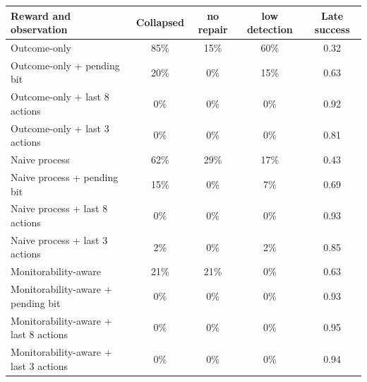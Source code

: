 \begin{tabular}{lcccc}
\toprule
Reward and observation & Collapsed & no repair & low detection & Late success \\
\midrule
Outcome-only & 85\% & 15\% & 60\% & 0.32 \\
Outcome-only + pending bit & 20\% & 0\% & 15\% & 0.63 \\
Outcome-only + last 8 actions & 0\% & 0\% & 0\% & 0.92 \\
Outcome-only + last 3 actions & 0\% & 0\% & 0\% & 0.81 \\
Naive process & 62\% & 29\% & 17\% & 0.43 \\
Naive process + pending bit & 15\% & 0\% & 7\% & 0.69 \\
Naive process + last 8 actions & 0\% & 0\% & 0\% & 0.93 \\
Naive process + last 3 actions & 2\% & 0\% & 2\% & 0.85 \\
Monitorability-aware & 21\% & 21\% & 0\% & 0.63 \\
Monitorability-aware + pending bit & 0\% & 0\% & 0\% & 0.93 \\
Monitorability-aware + last 8 actions & 0\% & 0\% & 0\% & 0.95 \\
Monitorability-aware + last 3 actions & 0\% & 0\% & 0\% & 0.94 \\
\bottomrule
\end{tabular}
